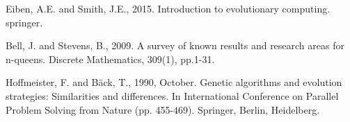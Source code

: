 \documentclass[conference]{IEEEtran}
\begin{document}
%
%
%
\begin{thebibliography}{1}

Eiben, A.E. and Smith, J.E., 2015. Introduction to evolutionary computing. springer.

Bell, J. and Stevens, B., 2009. A survey of known results and research areas for n-queens. Discrete Mathematics, 309(1), pp.1-31.

Hoffmeister, F. and Bäck, T., 1990, October. Genetic algorithms and evolution strategies: Similarities and differences. In International Conference on Parallel Problem Solving from Nature (pp. 455-469). Springer, Berlin, Heidelberg.


\end{thebibliography}




\end{document}
